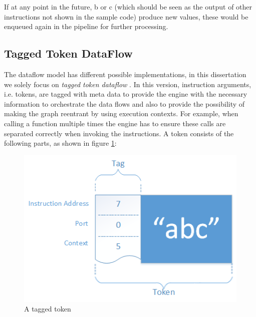 If at any point in the future, b or c (which should be seen as the output of other instructions not shown in the sample code) produce new values, these would be enqueued again in the pipeline for further processing.

\subsection{Tagged Token DataFlow}
\label{sec:tagged-token-dataflow}

The dataflow model has different possible implementations, in this dissertation we solely focus on \textit{tagged token dataflow} \cite{arvind_executing_1990}.
In this version, instruction arguments, i.e. tokens, are tagged with meta data to provide the engine with the necessary information to orchestrate the data flows and also to provide the possibility of making the graph reentrant by using execution contexts. For example, when calling a function multiple times the engine has to ensure these calls are separated correctly when invoking the instructions. A token consists of the following parts, as shown in figure \ref{fig:background-dataflow-token}:

\begin{figure}[ht]
	\centerline{\includegraphics[width=\textwidth]{images/background-dataflow-token.png}}
	\caption{A tagged token}
	\label{fig:background-dataflow-token}
\end{figure}

